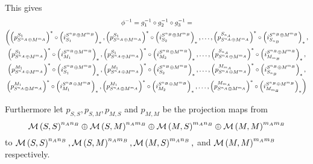 \begin{remark}
    This gives
    \begin{multline*}
        \phi^{-1} =  g_1^{-1} \circ g_2^{-1} \circ g_3^{-1} = \\
        \biggl(
            \left(  p_{S^{n_A} \oplus M^{m_A}}^{S_1}  \right)^* \circ \left(  i_{S_1}^{S^{n_B} \oplus M^{m_B}}  \right)_*, \left(  p_{S^{n_A} \oplus M^{m_A}}^{S_1}  \right)^* \circ \left(  i_{S_2}^{S^{n_B} \oplus M^{m_B}}  \right)_*, \dots, \left(  p_{S^{n_A} \oplus M^{m_A}}^{S_{n_A}}  \right)^* \circ \left(  i_{S_{n_B}}^{S^{n_B} \oplus M^{m_B}}  \right)_*, \\
            \left(  p_{S^{n_A} \oplus M^{m_A}}^{S_1}  \right)^* \circ \left(  i_{M_1}^{S^{n_B} \oplus M^{m_B}}  \right)_*, \left(  p_{S^{n_A} \oplus M^{m_A}}^{S_1}  \right)^* \circ \left(  i_{M_2}^{S^{n_B} \oplus M^{m_B}}  \right)_*, \dots, \left(  p_{S^{n_A} \oplus M^{m_A}}^{S_{n_A}}  \right)^* \circ \left(  i_{M_{m_B}}^{S^{n_B} \oplus M^{m_B}}  \right)_*, \\
            \left(  p_{S^{n_A} \oplus M^{m_A}}^{M_1}  \right)^* \circ \left(  i_{S_1}^{S^{n_B} \oplus M^{m_B}}  \right)_*, \left(  p_{S^{n_A} \oplus M^{m_A}}^{M_1}  \right)^* \circ \left(  i_{S_2}^{S^{n_B} \oplus M^{m_B}}  \right)_*, \dots, \left(  p_{S^{n_A} \oplus M^{m_A}}^{M_{m_A}}  \right)^* \circ \left(  i_{S_{n_B}}^{S^{n_B} \oplus M^{m_B}}  \right)_*, \\
            \left(  p_{S^{n_A} \oplus M^{m_A}}^{M_1}  \right)^* \circ \left(  i_{M_1}^{S^{n_B} \oplus M^{m_B}}  \right)_*, \left(  p_{S^{n_A} \oplus M^{m_A}}^{M_1}  \right)^* \circ \left(  i_{M_2}^{S^{n_B} \oplus M^{m_B}}  \right)_*, \dots, \left(  p_{S^{n_A} \oplus M^{m_A}}^{M_{m_A}}  \right)^* \circ \left(  i_{M_{m_B}}^{S^{n_B} \oplus M^{m_B}}  \right)_*
        \biggr)
    \end{multline*}

    Furthermore let \( p_{S, S}, p_{S, M}, p_{M, S} \) and \( p_{M, M} \) be the projection maps from
    \[
        {\mathcal{M}}\left( S, S \right)^{n_A n_B} \oplus {\mathcal{M}}\left( S, M \right)^{n_A m_B} \oplus {\mathcal{M}}\left( M, S \right)^{m_A n_B} \oplus {\mathcal{M}}\left( M, M \right)^{m_A m_B}
    \]
    to \( {\mathcal{M}}\left( S, S \right)^{n_A n_B}, {\mathcal{M}}\left( S, M \right)^{n_A m_B}, {\mathcal{M}}\left( M, S \right)^{m_A n_B}, \) and \( {\mathcal{M}}\left( M, M \right)^{m_A m_B}  \) respectively.
\end{remark}


